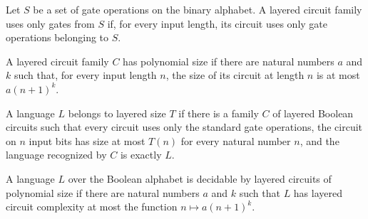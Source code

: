 \begin{definition}
\label{BoolCircuit.LayeredCircuitFamily.OnlyUsesGates}
\leanok
{}
Let $S$ be a set of gate operations on the binary alphabet. A layered circuit family
uses only gates from $S$ if, for every input length, its circuit uses only gate
operations belonging to $S$.
\end{definition}

\begin{definition}
\label{BoolCircuit.LayeredCircuitFamily.IsPolySize}
\leanok
{}
A layered circuit family $C$ has polynomial size if there are natural numbers $a$ and
$k$ such that, for every input length $n$, the size of its circuit at length $n$ is at
most $a(n+1)^k$.
\end{definition}

\begin{definition}
\label{Language.InLayeredSIZE}
\leanok
{}
A language $L$ belongs to layered size $T$ if there is a family $C$ of layered Boolean
circuits such that every circuit uses only the standard gate operations, the circuit on
$n$ input bits has size at most $T(n)$ for every natural number $n$, and the language
recognized by $C$ is exactly $L$.
\end{definition}

\begin{definition}
\label{Language.InLayeredPPoly}
\leanok
{}
A language $L$ over the Boolean alphabet is decidable by layered circuits of polynomial
size if there are natural numbers $a$ and $k$ such that $L$ has layered circuit
complexity at most the function $n\mapsto a(n+1)^k$.
\end{definition}

